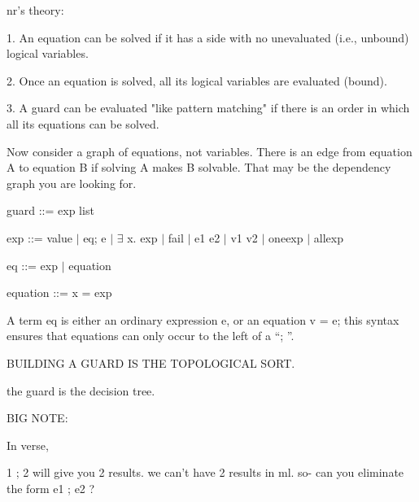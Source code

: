 \documentclass{article}
\begin{document}
nr's theory: 


1. An equation can be solved if it has a side with no unevaluated (i.e.,
unbound) logical variables. 

2. Once an equation is solved, all its logical variables are evaluated (bound). 

3. A guard can be evaluated "like pattern matching" if there is an order in
which all its equations can be solved. 

Now consider a graph of equations, not variables.  There is an edge from
equation A to equation B if solving A makes B solvable.  That may be the
dependency graph you are looking for.

guard ::= exp list 

exp ::= value $\vert$ eq; e $\vert$ $\exists$ x. exp $\vert$ fail $\vert$ e1 \choice e2 $\vert$ v1 v2 $\vert$ one{exp} $\vert$ all{exp}

eq ::= exp $\vert$ equation 

equation ::= x = exp 


A term eq is either an ordinary expression e, or an equation v = e; this syntax
ensures that equations can only occur to the left of a “; ”. 


BUILDING A GUARD IS THE TOPOLOGICAL SORT. 

the guard is the decision tree. 

BIG NOTE: 

In verse, 

1 ; 2 will give you 2 results. we can't have 2 results in ml. 
so- can you eliminate the form e1 ; e2 ? 

\end{document}
